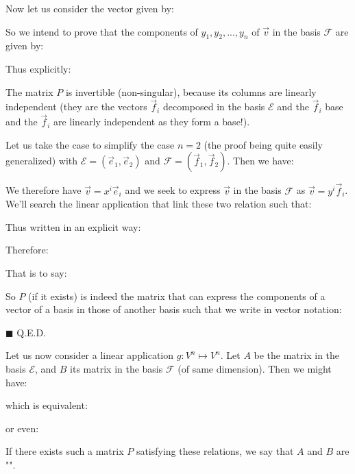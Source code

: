 	\begin{theorem}
	Now let us consider the vector given by:
	
	So we intend to prove that the components of $y_1,y_2,...,y_n$ of $\vec{v}$ in the basis $\mathcal{F}$ are given by:
	
	Thus explicitly:
	
	\begin{tcolorbox}[title=Remark,colframe=black,arc=10pt]
	The matrix $P$ is invertible (non-singular), because its columns are linearly independent (they are the vectors $\vec{f}_i$ decomposed in the basis $\mathcal{E}$ and the $\vec{f}_i$ base and the $\vec{f}_i$ are linearly independent as they form a base!).
	\end{tcolorbox}
	\end{theorem}
	\begin{dem}
	Let us take the case to simplify the case $n=2$ (the proof being quite easily generalized) with $\mathcal{E}=(\vec{e}_1,\vec{e}_2)$ and $\mathcal{F}=(\vec{f}_1,\vec{f}_2)$.
	Then we have:
	
	We therefore have $\vec{v}=x^i\vec{e}_i$ and we seek to express $\vec{v}$ in the basis $\mathcal{F}$ as $\vec{v}=y^i\vec{f}_i$. We'll search the linear application that link these two relation such that:
	
	Thus written in an explicit way:
	
	Therefore:
	
	That is to say:
	
	So $P$ (if it exists) is indeed the matrix that can express the components of a vector of a basis in those of another basis such that we write in vector notation:
	
	\begin{flushright}
		$\blacksquare$  Q.E.D.
	\end{flushright}
	\end{dem}
	\begin{theorem}
	Let us now consider a linear application $g:V^n\mapsto V^n$. Let $A$ be the matrix in the basis $\mathcal{E}$, and $B$ its matrix in the basis $\mathcal{F}$ (of same dimension). Then we might have:
	
	which is equivalent:
	
	or even:
	
	If there exists such a matrix $P$ satisfying these relations, we say that $A$ and $B$ are "".
	\end{theorem}
